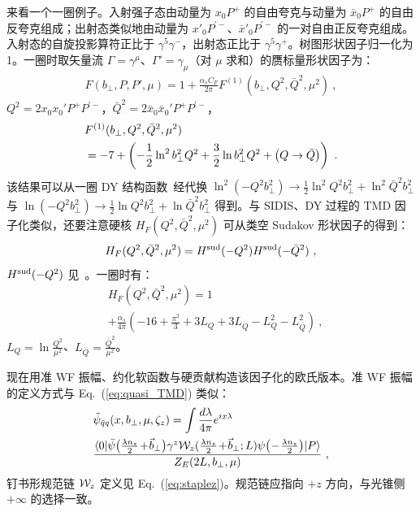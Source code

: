 来看一个一圈例子。入射强子态由动量为 $x_0P^+$ 的自由夸克与动量为 $\bar x_0 P^+$ 的自由反夸克组成；出射态类似地由动量为 $x'_0P^{'-}$、$\bar x'_0 P^{'-}$ 的一对自由正反夸克组成。入射态的自旋投影算符正比于 $\gamma^5 \gamma^-$，出射态正比于 $\gamma^5 \gamma^+$。树图形状因子归一化为 1。一圈时取矢量流 $\Gamma=\gamma^{\mu}$、$\Gamma'=\gamma_{\mu}$（对 $\mu$ 求和）的赝标量形状因子为：
\begin{align}
	F(b_\perp,P,P',\mu)=1+\frac{\alpha_s C_F}{2\pi}F^{(1)}(b_\perp,Q^2,\bar Q^2,\mu^2)\ ,
\end{align}
$Q^2=2x_0x_0'P^+P^{'-}$，$\bar Q^2=2\bar x_0\bar x_0'P^+P^{'-}$，
\begin{align}
	&F^{(1)}(b_\perp,Q^2,\bar Q^2,\mu^2) \\
	&=-7+\left(-\frac{1}{2}\ln^2 b^2_\perp Q^2+\frac{3}{2}\ln b^2_\perp Q^2+\left(Q \rightarrow \bar Q\right)\right) \ . \nonumber
\end{align}
该结果可以从一圈 DY 结构函数~\cite{DAlesio:2014mrz}经代换 $\ln^2(-Q^2b^2_\perp)\rightarrow \frac{1}{2}\ln^2 Q^2b^2_\perp+\ln^2 \bar Q^2b^2_\perp$ 与 $\ln(-Q^2b^2_\perp)\rightarrow \frac{1}{2}\ln Q^2b^2_\perp+\ln \bar Q^2b^2_\perp$ 得到。与 SIDIS、DY 过程的 TMD 因子化类似，还要注意硬核 $H_F(Q^2,\bar Q^2,\mu^2)$ 可从类空 Sudakov 形状因子的得到：
\begin{align}
	H_F(Q^2,\bar Q^2,\mu^2)=H^{\rm sud}(-Q^2)H^{\rm sud}(-\bar Q^2) \ ,
\end{align}
$H^{\rm sud}(-Q^2)$ 见~\cite{Collins:2017oxh}。一圈时有：
\begin{align}
	& H_F(Q^2,\bar Q^2,\mu^2)=1\nonumber \\
	&+\frac{\alpha_s}{4\pi}\left(-16+\frac{\pi^2}{3}+3L_Q+3L_{\bar Q}-L_Q^2-L_{\bar Q}^2\right)  \ ,
\end{align}
$L_Q=\ln \frac{Q^2}{\mu^2}$、$L_{\bar Q}=\frac{\bar Q^2}{\mu^2}$。

现在用准 WF 振幅、约化软函数与硬贡献构造该因子化的欧氏版本。准 WF 振幅的定义方式与 Eq.~(\ref{eq:quasi_TMD}) 类似：
\begin{align}
	&\tilde \psi_{\bar q q}(x,b_\perp,\mu,\zeta_z)=\int \frac{d\lambda}{4\pi}e^{ix\lambda}\nonumber\\
	&\frac{\langle 0| \bar \psi\big(\frac{\lambda n_z }{2}\!+\!\vec{b}_\perp\big)\gamma^z{\cal W}_{z}(\frac{\lambda n_z}{2}\!+\!\vec{b}_\perp;L)\psi\big(\!-\!\frac{\lambda n_z}{2}\big) |P\rangle}{Z_E(2L,b_\perp,\mu)} \ ,
\end{align}
钉书形规范链 ${\cal W}_z$ 定义见 Eq.~(\ref{eq:staplez})。规范链应指向 $+z$ 方向，与光锥侧 $+\infty$ 的选择一致。

